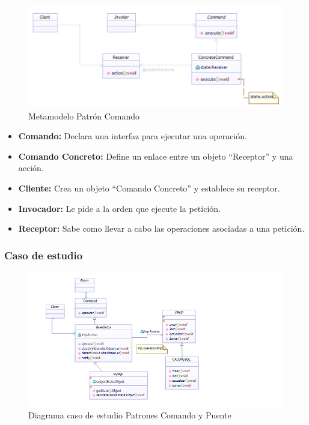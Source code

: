 \begin{figure}[th!]
	\centering
	\includegraphics[width=1\linewidth]{arquitectura/imagenes/modeloComando}
	\caption{Metamodelo Patrón Comando}
	\label{fig:metamodelo patron comando}
\end{figure}

\begin{itemize}
	\item \textbf{Comando: } Declara una interfaz para ejecutar una operación.
	\item \textbf{Comando Concreto: }Define un enlace entre un objeto “Receptor” y una acción. 
	\item \textbf{Cliente: }Crea un objeto “Comando Concreto” y establece su receptor.
	\item \textbf{Invocador: }Le pide a la orden que ejecute la petición.
	\item \textbf{Receptor: }Sabe como llevar a cabo las operaciones asociadas a una petición. 
\end{itemize}



\subsubsection{Caso de estudio}


\begin{figure}[th!]
	\centering
	\includegraphics[width=1.0\linewidth]{arquitectura/imagenes/DiagramaComandoYPuente}
	\caption{Diagrama caso de estudio Patrones Comando y Puente}
\end{figure}



